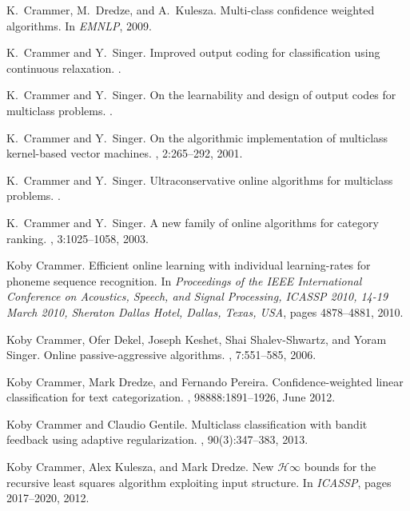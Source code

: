 \documentclass[12pt]{article}
\begin{document}
\begin{small}
\begin{thebibliography}{10}
K.~Crammer, M.~Dredze, and A.~Kulesza.
\newblock Multi-class confidence weighted algorithms.
\newblock In {\em EMNLP}, 2009.

K.~Crammer and Y.~Singer.
\newblock Improved output coding for classification using continuous
relaxation.
.

K.~Crammer and Y.~Singer.
\newblock On the learnability and design of output codes for multiclass
problems.
.

K.~Crammer and Y.~Singer.
\newblock On the algorithmic implementation of multiclass kernel-based vector
machines.
, 2:265--292, 2001.

K.~Crammer and Y.~Singer.
\newblock Ultraconservative online algorithms for multiclass problems.
.

K.~Crammer and Y.~Singer.
\newblock A new family of online algorithms for category ranking.
, 3:1025--1058, 2003.

Koby Crammer.
\newblock Efficient online learning with individual learning-rates for phoneme
sequence recognition.
\newblock In {\em Proceedings of the {IEEE} International Conference on
	Acoustics, Speech, and Signal Processing, {ICASSP} 2010, 14-19 March 2010,
	Sheraton Dallas Hotel, Dallas, Texas, {USA}}, pages 4878--4881, 2010.

Koby Crammer, Ofer Dekel, Joseph Keshet, Shai Shalev{-}Shwartz, and Yoram
Singer.
\newblock Online passive-aggressive algorithms.
, 7:551--585, 2006.

Koby Crammer, Mark Dredze, and Fernando Pereira.
\newblock Confidence-weighted linear classification for text categorization.
, 98888:1891--1926, June 2012.

Koby Crammer and Claudio Gentile.
\newblock Multiclass classification with bandit feedback using adaptive
regularization.
, 90(3):347--383, 2013.

Koby Crammer, Alex Kulesza, and Mark Dredze.
\newblock New $\mathcal{H}\infty$ bounds for the recursive least squares
algorithm exploiting input structure.
\newblock In {\em ICASSP}, pages 2017--2020, 2012.


\end{thebibliography}
\end{small}
\end{document}
